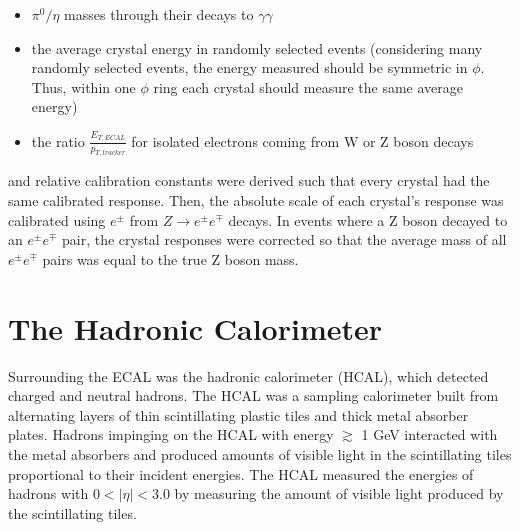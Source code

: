 \begin{itemize}
	\item $\pi^{0}/\eta$ masses through their decays to $\gamma\gamma$
	\item the average crystal energy in randomly selected events 
		(considering many randomly selected events, the energy measured should be symmetric in $\phi$.  Thus, within one $\phi$ ring each crystal should measure the same average energy)
	\item the ratio $\frac{E_{T,ECAL}}{p_{T,tracker}}$ for isolated electrons coming from W or Z boson decays
\end{itemize}

and relative calibration constants were derived such that every crystal had the same calibrated response.  
Then, the absolute scale of each crystal's response was calibrated using $e^{\pm}$ from 
$Z \rightarrow e^{\pm}e^{\mp}$ decays.  In events where a Z boson decayed to an $e^{\pm}e^{\mp}$ pair, the 
crystal responses were corrected so that the average mass of all $e^{\pm}e^{\mp}$ pairs was equal to 
the true Z boson mass.

\section{The Hadronic Calorimeter}
\label{sec:hcalDescription}
Surrounding the ECAL was the hadronic calorimeter (HCAL), which detected charged and neutral hadrons.  The 
HCAL was a sampling calorimeter built from alternating layers of thin scintillating plastic tiles and thick 
metal absorber plates.  Hadrons impinging on the HCAL with energy $\gtrsim$ 1 GeV interacted with the metal absorbers and produced amounts 
of visible light in the scintillating tiles proportional to their incident energies.  The HCAL 
measured the energies of hadrons with $0 < |\eta| < 3.0$ by measuring the amount of visible light produced 
by the scintillating tiles.


